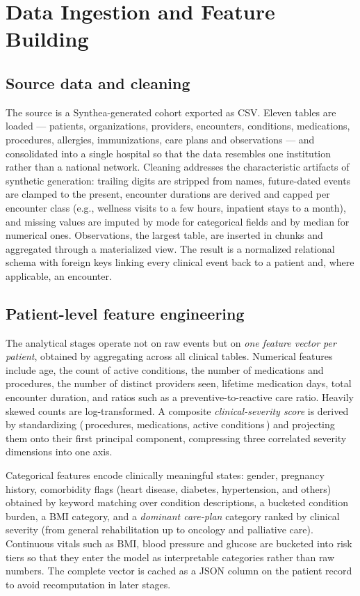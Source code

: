 \section{Data Ingestion and Feature Building}\label{sec:ingestion}

\subsection{Source data and cleaning}
The source is a Synthea-generated cohort exported as CSV. Eleven tables are
loaded --- patients, organizations, providers, encounters, conditions,
medications, procedures, allergies, immunizations, care plans and observations
--- and consolidated into a single hospital so that the data resembles one
institution rather than a national network. Cleaning addresses the
characteristic artifacts of synthetic generation: trailing digits are stripped
from names, future-dated events are clamped to the present, encounter durations
are derived and capped per encounter class (e.g., wellness visits to a few
hours, inpatient stays to a month), and missing values are imputed by mode for
categorical fields and by median for numerical ones. Observations, the largest
table, are inserted in chunks and aggregated through a materialized view. The
result is a normalized relational schema with foreign keys linking every
clinical event back to a patient and, where applicable, an encounter.

\subsection{Patient-level feature engineering}
The analytical stages operate not on raw events but on \emph{one feature vector
per patient}, obtained by aggregating across all clinical tables. Numerical
features include age, the count of active conditions, the number of medications
and procedures, the number of distinct providers seen, lifetime medication days,
total encounter duration, and ratios such as a preventive-to-reactive care
ratio. Heavily skewed counts are log-transformed. A composite
\emph{clinical-severity score} is derived by standardizing
(\,procedures, medications, active conditions\,) and projecting them onto their
first principal component, compressing three correlated severity dimensions into
one axis.

Categorical features encode clinically meaningful states: gender, pregnancy
history, comorbidity flags (heart disease, diabetes, hypertension, and others)
obtained by keyword matching over condition descriptions, a bucketed condition
burden, a BMI category, and a \emph{dominant care-plan} category ranked by
clinical severity (from general rehabilitation up to oncology and palliative
care). Continuous vitals such as BMI, blood pressure and glucose are bucketed
into risk tiers so that they enter the model as interpretable categories rather
than raw numbers. The complete vector is cached as a JSON column on the patient
record to avoid recomputation in later stages.
